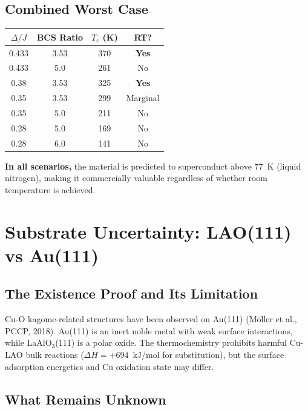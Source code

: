 \documentclass[11pt, a4paper]{article}
\begin{document}
\subsection{Combined Worst Case}

\begin{center}
\begin{tabular}{@{}cccc@{}}
\toprule
$\Delta/J$ & BCS Ratio & $T_c$ (K) & RT? \\
\midrule
0.433 & 3.53 & 370 & \textcolor{nm-green}{\textbf{Yes}} \\
0.433 & 5.0 & 261 & \textcolor{nm-red}{No} \\
0.38 & 3.53 & 325 & \textcolor{nm-green}{\textbf{Yes}} \\
0.35 & 3.53 & 299 & \textcolor{nm-orange}{Marginal} \\
0.35 & 5.0 & 211 & \textcolor{nm-red}{No} \\
0.28 & 5.0 & 169 & \textcolor{nm-red}{No} \\
0.28 & 6.0 & 141 & \textcolor{nm-red}{No} \\
\bottomrule
\end{tabular}
\end{center}

\textbf{In all scenarios,} the material is predicted to
superconduct above 77~K (liquid nitrogen), making it
commercially valuable regardless of whether room temperature
is achieved.

\section{Substrate Uncertainty: LAO(111) vs Au(111)}
\label{sec:substrate}

\subsection{The Existence Proof and Its Limitation}

Cu-O kagome-related structures have been observed on Au(111)
(M\"oller et al., PCCP, 2018). Au(111) is an inert noble metal
with weak surface interactions, while LaAlO$_3$(111) is a polar
oxide. The thermochemistry prohibits harmful Cu-LAO bulk
reactions ($\Delta H = +694$~kJ/mol for substitution), but the
surface adsorption energetics and Cu oxidation state may differ.

\subsection{What Remains Unknown}
\end{document}
